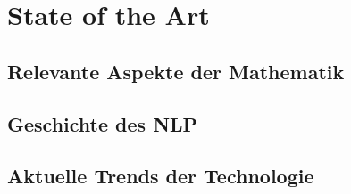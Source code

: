 \chapter{State of the Art}\label{ch:data}

\section{Relevante Aspekte der Mathematik}

\section{Geschichte des NLP}

\section{Aktuelle Trends der Technologie}
